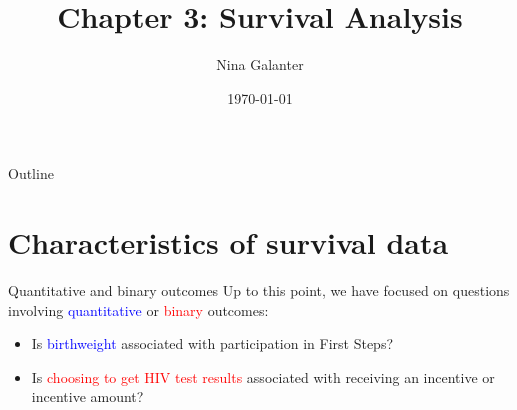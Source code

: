 \documentclass[10pt,t]{beamer}
\title{Chapter 3: Survival Analysis}
\author{Nina Galanter}
\date{\today}
\begin{document}
\begin{frame}
	\titlepage 
\end{frame}

%	
%	

\begin{frame}{Outline}
	\tableofcontents
\end{frame}



\section{Characteristics of survival data}

\begin{frame}{Quantitative and binary outcomes}
Up to this point, we have focused on questions involving \textcolor{blue}{quantitative} or \textcolor{red}{binary} outcomes: 

\medskip

\begin{itemize}
\item Is \textcolor{blue}{birthweight} associated with participation in First Steps?

\medskip

\item Is \textcolor{red}{choosing to get HIV test results} associated with receiving an incentive or incentive amount? 
\end{itemize}
\end{frame}
\end{document}
